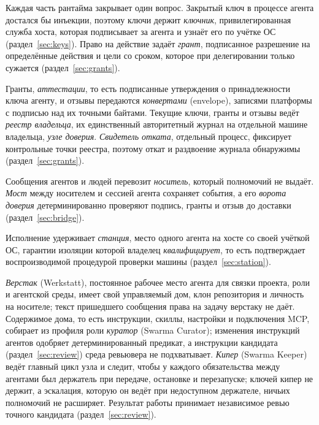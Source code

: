 \documentclass[10pt,a4paper]{article}
\begin{document}
Каждая часть рантайма закрывает один вопрос. Закрытый ключ в процессе агента достался бы инъекции, поэтому ключи держит \emph{ключник}, привилегированная служба хоста, которая подписывает за агента и узнаёт его по учётке ОС (раздел~\ref{sec:keys}). Право на действие задаёт \emph{грант}, подписанное разрешение на определённые действия и цели со сроком, которое при делегировании только сужается (раздел~\ref{sec:grants}).

Гранты, \emph{аттестации}, то есть подписанные утверждения о принадлежности ключа агенту, и отзывы передаются \emph{конвертами} (envelope), записями платформы с подписью над их точными байтами. Текущие ключи, гранты и отзывы ведёт \emph{реестр владельца}, их единственный авторитетный журнал на отдельной машине владельца, \emph{узле доверия}. \emph{Свидетель отката}, отдельный процесс, фиксирует контрольные точки реестра, поэтому откат и раздвоение журнала обнаружимы (раздел~\ref{sec:grants}).

Сообщения агентов и людей перевозит \emph{носитель}, который полномочий не выдаёт. \emph{Мост} между носителем и сессией агента сохраняет события, а его \emph{ворота доверия} детерминированно проверяют подпись, гранты и отзыв до доставки (раздел~\ref{sec:bridge}).

Исполнение удерживает \emph{станция}, место одного агента на хосте со своей учёткой ОС, гарантии изоляции которой владелец \emph{квалифицирует}, то есть подтверждает воспроизводимой процедурой проверки машины (раздел~\ref{sec:station}).

\emph{Верстак} (Werkstatt), постоянное рабочее место агента для связки проекта, роли и агентской среды, имеет свой управляемый дом, клон репозитория и личность на носителе; текст пришедшего сообщения права на задачу верстаку не даёт. Содержимое дома, то есть инструкции, скиллы, настройки и подключения MCP, собирает из профиля роли \emph{куратор} (Swarma Curator); изменения инструкций агентов одобряет детерминированный предикат, а инструкции кандидата (раздел~\ref{sec:review}) среда ревьювера не подхватывает. \emph{Кипер} (Swarma Keeper) ведёт главный цикл узла и следит, чтобы у каждого обязательства между агентами был держатель при передаче, остановке и перезапуске; ключей кипер не держит, а эскалация, которую он ведёт при недоступном держателе, ничьих полномочий не расширяет. Результат работы принимает независимое ревью точного кандидата (раздел~\ref{sec:review}).
\end{document}
